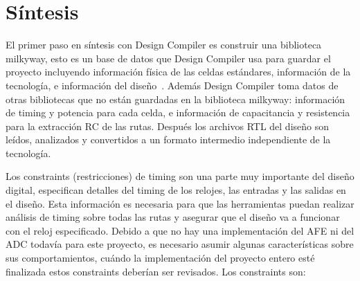 \documentclass[a4paper, twoside, 11pt]{report}
\begin{document}
\FloatBarrier
\section{Síntesis}

El primer paso en síntesis con Design Compiler es construir una biblioteca milkyway, esto es un base de datos que Design Compiler usa para guardar el proyecto incluyendo información física de las celdas estándares, información de la tecnología, e información del diseño~\cite{milkyway_database_app_note}. Además Design Compiler toma datos de otras bibliotecas que no están guardadas en la biblioteca milkyway: información de timing y potencia para cada celda, e información de capacitancia y resistencia para la extracción RC de las rutas. Después los archivos RTL del diseño son leídos, analizados y convertidos a un formato intermedio independiente de la tecnología.

Los constraints (restricciones) de timing son una parte muy importante del diseño digital, especifican detalles del timing de los relojes, las entradas y las salidas en el diseño. Esta información es necesaria para que las herramientas puedan realizar análisis de timing sobre todas las rutas y asegurar que el diseño va a funcionar con el reloj especificado. Debido a que no hay una implementación del AFE ni del ADC todavía para este proyecto, es necesario asumir algunas características sobre sus comportamientos, cuándo la implementación del proyecto entero esté finalizada estos constraints deberían ser revisados. Los constraints son:
\end{document}
